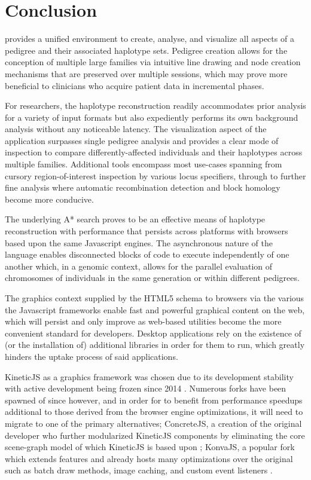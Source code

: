 \section{Conclusion}

\haplo provides a unified environment to create, analyse, and visualize all aspects of a pedigree and their associated haplotype sets. Pedigree creation allows for the conception of multiple large families via intuitive line drawing and node creation mechanisms that are preserved over multiple sessions, which may prove more beneficial to clinicians who acquire patient data in incremental phases.

For researchers, the haplotype reconstruction readily accommodates prior analysis for a variety of input formats but also expediently performs its own background analysis without any noticeable latency. The visualization aspect of the application surpasses single pedigree analysis and provides a clear mode of inspection to compare differently-affected individuals and their haplotypes across multiple families. Additional tools encompass most use-cases spanning from cursory region-of-interest inspection by various locus specifiers, through to further fine analysis where automatic recombination detection and block homology become more conducive.

The underlying A* search proves to be an effective means of haplotype reconstruction with performance that persists across platforms with browsers based upon the same Javascript engines. The asynchronous nature of the language enables disconnected blocks of code to execute independently of one another which, in a genomic context, allows for the parallel evaluation of chromosomes of individuals in the same generation or within different pedigrees. 

The graphics context supplied by the HTML5 schema to browsers via the various the Javascript frameworks enable fast and powerful graphical content on the web, which will persist and only improve as web-based utilities become the more convenient standard for developers. Desktop applications rely on the existence of (or the installation of) additional libraries in order for them to run, which greatly hinders the uptake process of said applications.

KineticJS as a graphics framework was chosen due to its development stability with active development being frozen since 2014 \citep{kinetictar}. Numerous forks have been spawned of since however, and in order for \haplo to benefit from performance speedups additional to those derived from the browser engine optimizations, it will need to migrate to one of the primary alternatives; ConcreteJS, a creation of the original developer who further modularized KineticJS components by eliminating the core scene-graph model of which KineticJS is based upon \citep{concretejs}; KonvaJS, a popular fork which extends features and already hosts many optimizations over the original such as batch draw methods, image caching, and custom event listeners \citep{konvajs}.


